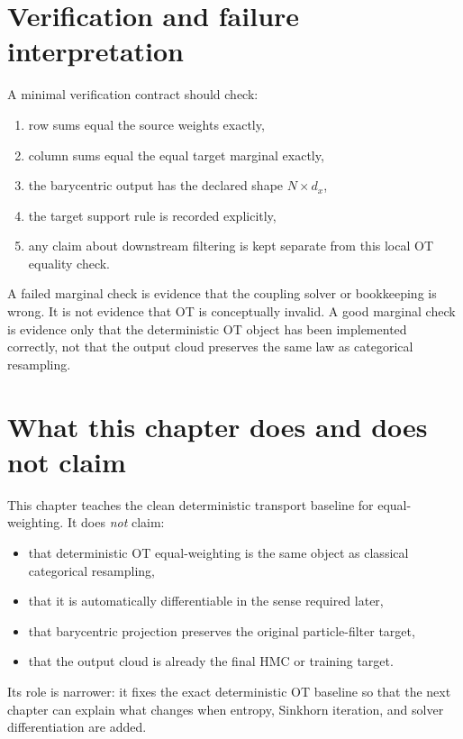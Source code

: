 \section{Verification and failure interpretation}
\label{sec:bf-ot-baseline-verification}

A minimal verification contract should check:
\begin{enumerate}[label=(\arabic*)]
  \item row sums equal the source weights exactly,
  \item column sums equal the equal target marginal exactly,
  \item the barycentric output has the declared shape \(N\times d_x\),
  \item the target support rule is recorded explicitly,
  \item any claim about downstream filtering is kept separate from this local OT
  equality check.
\end{enumerate}

A failed marginal check is evidence that the coupling solver or bookkeeping is
wrong.  It is not evidence that OT is conceptually invalid.  A good marginal check
is evidence only that the deterministic OT object has been implemented correctly,
not that the output cloud preserves the same law as categorical resampling.

\section{What this chapter does and does not claim}
\label{sec:bf-ot-baseline-boundary}

This chapter teaches the clean deterministic transport baseline for equal-
weighting.  It does \emph{not} claim:
\begin{itemize}
  \item that deterministic OT equal-weighting is the same object as classical
    categorical resampling,
  \item that it is automatically differentiable in the sense required later,
  \item that barycentric projection preserves the original particle-filter target,
  \item that the output cloud is already the final HMC or training target.
\end{itemize}
Its role is narrower: it fixes the exact deterministic OT baseline so that the
next chapter can explain what changes when entropy, Sinkhorn iteration, and
solver differentiation are added.

\FloatBarrier
